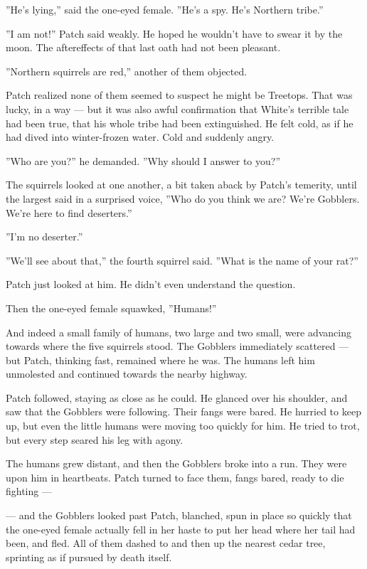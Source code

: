 \documentclass[12pt]{book}
\begin{document}
''He's lying,'' said the one-eyed female. ''He's a spy. He's Northern tribe.''

''I am not!'' Patch said weakly. He hoped he wouldn't have to swear it by the moon. The aftereffects of that last oath had not been pleasant. 

''Northern squirrels are red,'' another of them objected.

Patch realized none of them seemed to suspect he might be Treetops. That was lucky, in a way ---
but it was also awful confirmation that White's terrible tale had been true, that his whole tribe had been extinguished. He felt cold, as if he had dived into winter-frozen water. Cold and suddenly angry.

''Who are you?'' he demanded. ''Why should I answer to you?''

The squirrels looked at one another, a bit taken aback by Patch's temerity, until the largest said in a surprised voice, ''Who do you think we are? We're Gobblers. We're here to find deserters.''

''I'm no deserter.''

''We'll see about that,'' the fourth squirrel said. ''What is the name of your rat?''

Patch just looked at him. He didn't even understand the question.

Then the one-eyed female squawked, ''Humans!''

And indeed a small family of humans, two large and two small, were advancing towards where the five squirrels stood. The Gobblers immediately scattered ---
but Patch, thinking fast, remained where he was. The humans left him unmolested and continued towards the nearby highway.

Patch followed, staying as close as he could. He glanced over his shoulder, and saw that the Gobblers were following. Their fangs were bared. He hurried to keep up, but even the little humans were moving too quickly for him. He tried to trot, but every step seared his leg with agony.

The humans grew distant, and then the Gobblers broke into a run. They were upon him in heartbeats. Patch turned to face them, fangs bared, ready to die fighting ---

---
and the Gobblers looked past Patch, blanched, spun in place so quickly that the one-eyed female actually fell in her haste to put her head where her tail had been, and fled. All of them dashed to and then up the nearest cedar tree, sprinting as if pursued by death itself.
\end{document}
